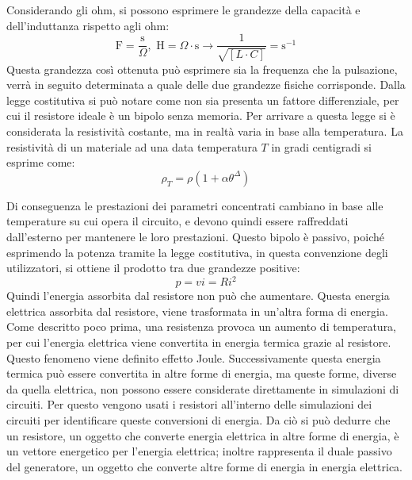 \documentclass{article}
\newcommand{\SI}[1]{\mathrm{#1}}
\numberwithin{equation}{subsection}
\begin{document}
Considerando gli ohm, si possono esprimere le grandezze della capacità e dell'induttanza rispetto agli ohm:
\begin{equation*}
    \SI{F}=\displaystyle\frac{\SI{s}}{\Omega},\,\,\SI{H}=\Omega\cdot \SI{s}\to \frac{1}{\sqrt{[L\cdot C]}}=\SI{s}^{-1}
\end{equation*}
Questa grandezza così ottenuta può esprimere sia la frequenza che la pulsazione, verrà in seguito determinata a quale delle due grandezze fisiche corrisponde. 
Dalla legge costitutiva si può notare come non sia presenta un fattore differenziale, per cui il resistore ideale è un bipolo senza memoria. Per arrivare a questa legge 
si è considerata la resistività costante, ma in realtà varia in base alla temperatura. La resistività di un materiale ad una data temperatura $T$ in gradi centigradi si esprime 
come:
\begin{equation*}
    \rho_T=\rho\left(1+\alpha\theta^\Delta\right)
\end{equation*}

Di conseguenza le prestazioni dei parametri concentrati cambiano in base alle temperature su cui opera il circuito, e devono quindi essere raffreddati dall'esterno per mantenere 
le loro prestazioni. Questo bipolo è passivo, poiché esprimendo la potenza tramite la legge costitutiva, in questa convenzione degli utilizzatori, si ottiene il prodotto 
tra due grandezze positive:
\begin{equation*}
    p=vi=Ri^2
\end{equation*}
Quindi l'energia assorbita dal resistore non può che aumentare. Questa energia elettrica assorbita dal resistore, viene trasformata in un'altra forma di energia. Come 
descritto poco prima, una resistenza provoca un aumento di temperatura, per cui l'energia elettrica viene convertita in energia termica grazie al resistore. Questo fenomeno 
viene definito effetto Joule. Successivamente questa energia termica può essere convertita in altre forme di energia, ma queste forme, diverse da quella elettrica, non possono 
essere considerate direttamente in simulazioni di circuiti. Per questo vengono usati i resistori all'interno delle simulazioni dei circuiti per identificare queste 
conversioni di energia. Da ciò si può dedurre che un resistore, un oggetto che converte energia elettrica in altre forme di energia, è un vettore energetico per l'energia 
elettrica; inoltre rappresenta il duale passivo del generatore, un oggetto che converte altre forme di energia in energia elettrica. 
\end{document}
